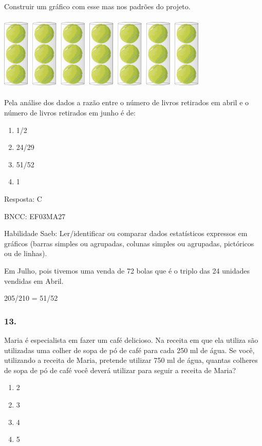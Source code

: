 Construir um gráfico com esse mas nos padrões do projeto.

\includegraphics[width=3.93590in,height=1.40906in]{media/image121.png}

Pela análise dos dados a razão entre o número de livros retirados em
abril e o número de livros retirados em junho é de:

\begin{enumerate}
\def\labelenumi{\alph{enumi})}
\item
  1/2
\item
  24/29
\item
  51/52
\item
  1
\end{enumerate}

Resposta: C

BNCC: EF03MA27

Habilidade Saeb: Ler/identificar ou comparar dados estatísticos
expressos em gráficos (barras simples ou agrupadas, colunas simples ou
agrupadas, pictóricos ou de linhas).

Em Julho, pois tivemos uma venda de 72 bolas que é o triplo das 24
unidades vendidas em Abril.

205/210 = 51/52

\subsubsection{13.}\label{section-153}

Maria é especialista em fazer um café delicioso. Na receita em que ela
utiliza são utilizadas uma colher de sopa de pó de café para cada 250 ml
de água. Se você, utilizando a receita de Maria, pretende utilizar 750
ml de água, quantas colheres de sopa de pó de café você deverá utilizar
para seguir a receita de Maria?

\begin{enumerate}
\def\labelenumi{\alph{enumi})}
\item
  2
\item
  3
\item
  4
\item
  5
\end{enumerate}

